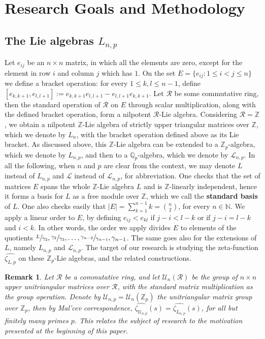 \documentclass[12pt]{article}
\newtheorem{remark}[theorem]{Remark}
\begin{document}
\section{Research Goals and Methodology}
\subsection{The Lie algebras $L_{n,p}$}
Let $e_{ij}$ be an $n\times{n}$ matrix, in which all the elements are zero, except for the element in row $i$ and column $j$ which has $1$. On the set $E=\{e_{ij} : 1\leq{i}<{j}\leq{n}\}$ we define a bracket operation: for every $1\leq{k,l}\leq{n-1}$, define $[e_{k,k+1},e_{l,l+1}]:=e_{k,k+1}e_{l,l+1}-e_{l,l+1}e_{k,k+1}$. Let $\mathcal{R}$ be some commutative ring, then the standard operation of $\mathcal{R}$ on $E$ through scalar multiplication, along with the defined bracket operation, form a nilpotent $\mathcal{R}$-Lie algebra. Considering $\mathcal{R}=\mathbb{Z}$, we obtain a nilpotent $\mathbb{Z}$-Lie algebra of strictly upper triangular matrices over $\mathbb{Z}$, which we denote by $L_{n}$, with the bracket operation defined above as its Lie bracket. As discussed above, this $\mathbb{Z}$-Lie algebra can be extended to a $\mathbb{Z}_p$-algebra, which we denote by $L_{n,p}$, and then to a $\mathbb{Q}_p$-algebra, which we denote by $\mathcal{L}_{n,p}$. In all the following, when $n$ and $p$ are clear from the context, we may denote $L$ instead of $L_{n,p}$ and $\mathcal{L}$ instead of $\mathcal{L}_{n,p}$, for abbreviation.
One checks that the set of matrices $E$ spans the whole $\mathbb{Z}$-Lie algebra $L$ and is $\mathbb{Z}$-linearly independent, hence it forms a basis for $L$ as a free module over $\mathbb{Z}$, which we call the \textbf{standard basis} of $L$. One also checks easily that $|E|=\sum_{k=1}^{n-1}k=\binom{n}{2}$, for every $n\in\mathbb{N}$. We apply a linear order to $E$, by defining $e_{ij}<e_{kl}$ if $j-i<l-k$ or if $j-i=l-k$ and $i<k$. In other words, the order we apply divides $E$ to elements of the quotients $\sfrac{L}{\gamma_2},\sfrac{\gamma_2}{\gamma_3},\dots,\sfrac{\gamma_{n-2}}{\gamma_{n-1}},\gamma_{n-1}$. The same goes also for the extensions of $L$, namely $L_{n,p}$ and $\mathcal{L}_{n,p}$. The target of our research is studying the zeta-function $\hat{\zeta_{L,p}}$ on these $\mathbb{Z}_p$-Lie algebras, and the related constructions.
\begin{remark}
Let $\mathcal{R}$ be a commutative ring, and let $\mathcal{U}_n(\mathcal{R})$ be the group of $n\times{n}$ upper unitriangular matrices over $\mathcal{R}$, with the standard matrix multiplication as the group operation. Denote by $\mathcal{U}_{n,p}=\mathcal{U}_n(\mathbb{Z}_p)$ the unitriangular matrix group over $\mathbb{Z}_p$, then by Mal'cev correspondence, $\hat{\zeta_{\mathcal{U}_{n,p}}}(s)=\hat{\zeta_{L_{n,p}}}(s)$, for all but finitely many primes $p$. This relates the subject of research to the motivation presented at the beginning of this paper.
\end{remark}
\end{document}
